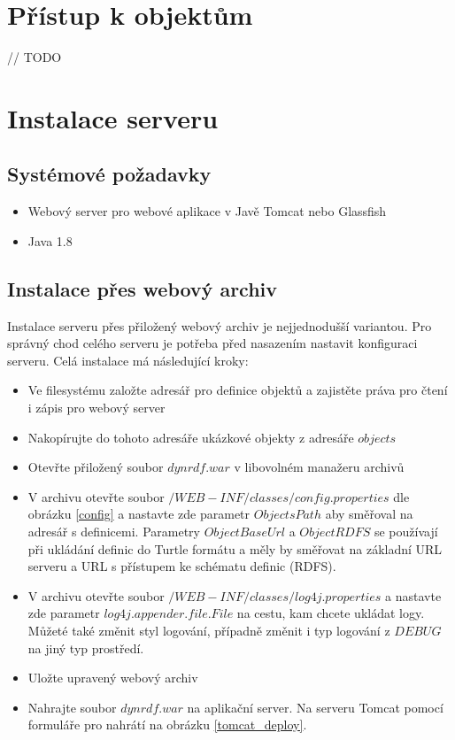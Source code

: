 \documentclass[thesis=B,czech]{FITthesis}[2012/06/26]
\begin{document}
    \section{Přístup k objektům}\label{obj_access}
    // TODO
    
  \section{Instalace serveru}
  
  \subsection{Systémové požadavky}
  \begin{itemize}
   \item Webový server pro webové aplikace v Javě Tomcat nebo Glassfish
   \item Java 1.8
  \end{itemize}
    
  \subsection{Instalace přes webový archiv}
  Instalace serveru přes přiložený webový archiv je nejjednodušší variantou. Pro správný chod celého serveru je potřeba před nasazením nastavit konfiguraci serveru.
  Celá instalace má následující kroky:
  \begin{itemize}
   \item Ve filesystému založte adresář pro definice objektů a zajistěte práva pro čtení i zápis pro webový server
   \item Nakopírujte do tohoto adresáře ukázkové objekty z adresáře $objects$
   \item Otevřte přiložený soubor $dynrdf.war$ v libovolném manažeru archivů
   \item V archivu otevřte soubor $/WEB-INF/classes/config.properties$ dle obrázku \ref{config} a nastavte zde parametr $ObjectsPath$ aby směřoval na 
   adresář s definicemi. Parametry $ObjectBaseUrl$ a $ObjectRDFS$ se používají při ukládání definic do Turtle formátu a měly by směřovat na základní URL serveru
   a URL s přístupem ke schématu definic (RDFS).
   \item V archivu otevřte soubor $/WEB-INF/classes/log4j.properties$ a nastavte zde parametr $log4j.appender.file.File$ na cestu, kam chcete ukládat logy.
   Můžeté také změnit styl logování, případně změnit i typ logování z $DEBUG$ na jiný typ prostředí.
   \item Uložte upravený webový archiv
   \item Nahrajte soubor $dynrdf.war$ na aplikační server. Na serveru Tomcat pomocí formuláře pro nahrátí na obrázku \ref{tomcat_deploy}.
  \end{itemize}
\end{document}
